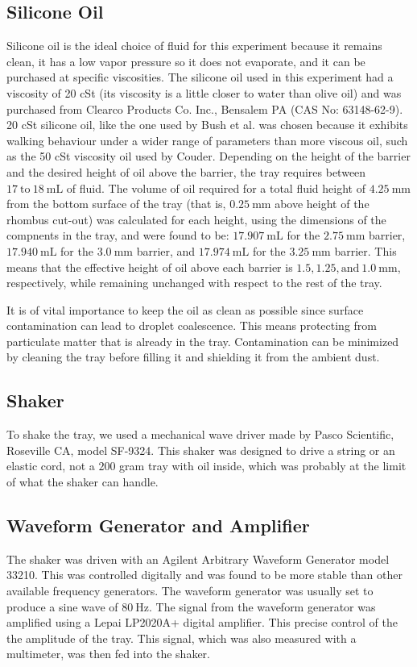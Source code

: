 \subsection{Silicone Oil}
    Silicone oil is the ideal choice of fluid for this experiment because it remains clean, it has a low vapor pressure so it does not evaporate, and it can be purchased at specific viscosities. The silicone oil used in this experiment had a viscosity of 20 cSt (its viscosity is a little closer to water than olive oil) and was purchased from Clearco Products Co. Inc., Bensalem PA (CAS No: 63148-62-9). 20 cSt silicone oil, like the one used by Bush et al. was chosen because it exhibits walking behaviour under a wider range of parameters than more viscous oil, such as the 50 cSt viscosity oil used by Couder. Depending on the height of the barrier and the desired height of oil above the barrier, the tray requires between $17~\mathrm{to}~18~\mathrm{mL}$ of fluid. The volume of oil required for a total fluid height of $4.25~\mathrm{mm}$ from the bottom surface of the tray (that is, $0.25~\mathrm{mm}$ above height of the rhombus cut-out) was calculated for each height, using the dimensions of the compnents in the tray, and were found to be: $17.907~\mathrm{mL}$ for the $2.75~\mathrm{mm}$ barrier, $17.940~\mathrm{mL}$ for the $3.0~\mathrm{mm}$ barrier, and $17.974~\mathrm{mL}$ for the $3.25~\mathrm{mm}$ barrier. This means that the effective height of oil above each barrier is $1.5, 1.25, \mathrm{and}~1.0~\mathrm{mm}$, respectively, while remaining unchanged with respect to the rest of the tray.
    
    It is of vital importance to keep the oil as clean as possible since surface contamination can lead to droplet coalescence. This means protecting from particulate matter that is already in the tray. Contamination can be minimized by cleaning the tray before filling it and shielding it from the ambient dust.
    
\subsection{Shaker}
    To shake the tray, we used a mechanical wave driver made by Pasco Scientific, Roseville CA, model SF-9324. This shaker was designed to drive a string or an elastic cord, not a $200$ gram tray with oil inside, which was probably at the limit of what the shaker can handle. 

\subsection{Waveform Generator and Amplifier}
    The shaker was driven with an Agilent Arbitrary Waveform Generator model 33210. This was controlled digitally and was found to be more stable than other available frequency generators. The waveform generator was usually set to produce a sine wave of $80~\mathrm{Hz}$. The signal from the waveform generator was amplified using a Lepai LP2020A+ digital amplifier. This precise control of the the amplitude of the tray. This signal, which was also measured with a multimeter, was then fed into the shaker.    
            
